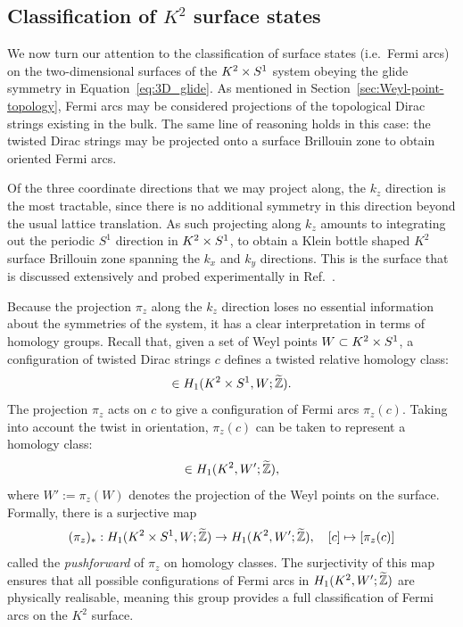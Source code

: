 \subsection{Classification of \texorpdfstring{$K^2$}{K²} surface states}

We now turn our attention to the classification of surface states (i.e.\ Fermi arcs) on the two-dimensional surfaces of the $K^2\times S^1$ system obeying the glide symmetry in Equation~\eqref{eq:3D_glide}. As mentioned in Section~\ref{sec:Weyl-point-topology}, Fermi arcs may be considered projections of the topological Dirac strings existing in the bulk. The same line of reasoning holds in this case: the twisted Dirac strings may be projected onto a surface Brillouin zone to obtain oriented Fermi arcs.

Of the three coordinate directions that we may project along, the $k_z$ direction is the most tractable, since there is no additional symmetry in this direction beyond the usual lattice translation. As such projecting along $k_z$ amounts to integrating out the periodic $S^1$ direction in $K^2\times S^1$, to obtain a Klein bottle shaped $K^2$ surface Brillouin zone spanning the $k_x$ and $k_y$ directions. This is the surface that is discussed extensively and probed experimentally in Ref.~\cite{Fonseca-Vaidya_nonorientable}.

Because the projection $\pi_z$ along the $k_z$ direction loses no essential information about the symmetries of the system, it has a clear interpretation in terms of homology groups. Recall that, given a set of Weyl points $W\subset K^2\times S^1$, a configuration of twisted Dirac strings $c$ defines a twisted relative homology class:
\begin{equation*}
	[c]\in H_1(\KS,W;\ext{\Z}).
\end{equation*}
The projection $\pi_z$ acts on $c$ to give a configuration of Fermi arcs $\pi_z(c)$. Taking into account the twist in orientation, $\pi_z(c)$ can be taken to represent a homology class:
\begin{equation*}
	[\pi_z(c)]\in H_1(K^2,W';\ext{\Z}),
\end{equation*}
where $W':=\pi_z(W)$ denotes the projection of the Weyl points on the surface. Formally, there is a surjective map
\begin{equation*}
	(\pi_z)_*: H_1(K^2\times S^1,W;\widetilde{\mathbb{Z}}) \to H_1(K^2,W';\widetilde{\mathbb{Z}}),\quad [c] \mapsto [\pi_z(c)]
\end{equation*}
called the \emph{pushforward} of $\pi_z$ on homology classes. The surjectivity of this map ensures that all possible configurations of Fermi arcs in $H_1(K^2,W';\widetilde{\mathbb{Z}})$ are physically realisable, meaning this group provides a full classification of Fermi arcs on the $K^2$ surface.

